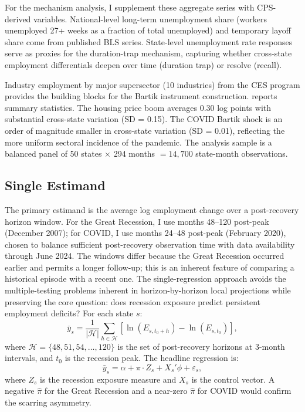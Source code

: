 \documentclass[12pt]{article}
\begin{document}
For the mechanism analysis, I supplement these aggregate series with CPS-derived variables. National-level long-term unemployment share (workers unemployed 27+ weeks as a fraction of total unemployed) and temporary layoff share come from published BLS series. State-level unemployment rate responses serve as proxies for the duration-trap mechanism, capturing whether cross-state employment differentials deepen over time (duration trap) or resolve (recall).

Industry employment by major supersector (10 industries) from the CES program provides the building blocks for the Bartik instrument construction. 
 reports summary statistics. The housing price boom averages 0.30 log points with substantial cross-state variation (SD = 0.15). The COVID Bartik shock is an order of magnitude smaller in cross-state variation (SD = 0.01), reflecting the more uniform sectoral incidence of the pandemic. The analysis sample is a balanced panel of 50 states $\times$ 294 months $= 14{,}700$ state-month observations.



\subsection{Single Estimand}

The primary estimand is the average log employment change over a post-recovery horizon window. For the Great Recession, I use months 48--120 post-peak (December 2007); for COVID, I use months 24--48 post-peak (February 2020), chosen to balance sufficient post-recovery observation time with data availability through June 2024. The windows differ because the Great Recession occurred earlier and permits a longer follow-up; this is an inherent feature of comparing a historical episode with a recent one. The single-regression approach avoids the multiple-testing problems inherent in horizon-by-horizon local projections while preserving the core question: does recession exposure predict persistent employment deficits? For each state $s$:
\begin{equation}
\bar{y}_s = \frac{1}{|\mathcal{H}|} \sum_{h \in \mathcal{H}} \left[ \ln(E_{s,t_0+h}) - \ln(E_{s,t_0}) \right],
\end{equation}
where $\mathcal{H} = \{48, 51, 54, \ldots, 120\}$ is the set of post-recovery horizons at 3-month intervals, and $t_0$ is the recession peak. The headline regression is:
\begin{equation}
\bar{y}_s = \alpha + \pi \cdot Z_s + X_s'\phi + \varepsilon_s,
\label{eq:main}
\end{equation}
where $Z_s$ is the recession exposure measure and $X_s$ is the control vector. A negative $\hat{\pi}$ for the Great Recession and a near-zero $\hat{\pi}$ for COVID would confirm the scarring asymmetry.
\end{document}
